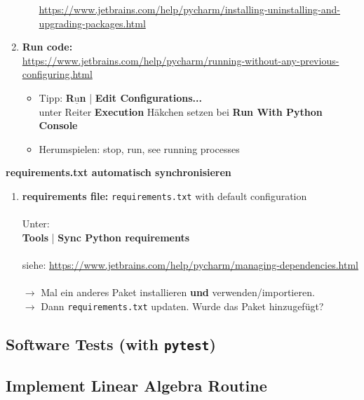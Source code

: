 \begin{enumerate}
\begin{itemize}
		            {\small \url{https://www.jetbrains.com/help/pycharm/installing-uninstalling-and-upgrading-packages.html}}
	      \end{itemize}
	\item \textbf{Run code:}\\ \url{https://www.jetbrains.com/help/pycharm/running-without-any-previous-configuring.html}
	      \begin{itemize}
		      \item Tipp: \textbf{R$\underline{\text{u}}$n} | \textbf{Edit Configurations...} \\
		            unter Reiter \textbf{Execution} Häkchen setzen bei \textbf{Run With Python Console}
		      \item Herumspielen: stop, run, see running processes
	      \end{itemize}
\end{enumerate}



\textbf{requirements.txt automatisch synchronisieren}

\begin{enumerate}
	\item \textbf{requirements file:} \texttt{requirements.txt} with default configuration\\~\\
	      Unter:\\
	      \textbf{Tools} | \textbf{Sync Python requirements}~\\
	      ~\\
	      siehe: \url{https://www.jetbrains.com/help/pycharm/managing-dependencies.html}\\~\\
	      $\to$ Mal ein anderes Paket installieren \textbf{und} verwenden/importieren.\\
	      $\to$ Dann \texttt{requirements.txt} updaten. Wurde das Paket hinzugefügt?
\end{enumerate}






\subsection{Software Tests (with \texttt{pytest})}

\subsection{Implement Linear Algebra Routine}



